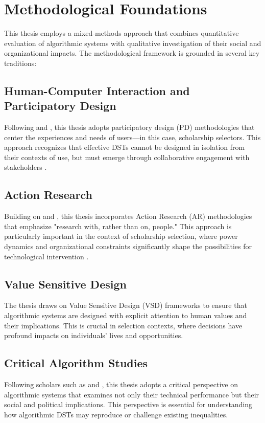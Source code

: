 \section{Methodological Foundations}\label{sec:methods_background}

This thesis employs a mixed-methods approach that combines quantitative evaluation of algorithmic systems with qualitative investigation of their social and organizational impacts. The methodological framework is grounded in several key traditions:

\subsection{Human-Computer Interaction and Participatory Design}
Following \textcite{blythe2014research} and \textcite{Knapp_Zeratzky_Kowitz_2016}, this thesis adopts participatory design (PD) methodologies that center the experiences and needs of users—in this case, scholarship selectors. This approach recognizes that effective DSTs cannot be designed in isolation from their contexts of use, but must emerge through collaborative engagement with stakeholders \cite{braun_using_2006}.

\subsection{Action Research}
Building on \textcite{Hayes_2011} and \textcite{bradbury_action_2003}, this thesis incorporates Action Research (AR) methodologies that emphasize "research with, rather than on, people." This approach is particularly important in the context of scholarship selection, where power dynamics and organizational constraints significantly shape the possibilities for technological intervention \cite{lu_organizing_2023}.

\subsection{Value Sensitive Design}
The thesis draws on Value Sensitive Design (VSD) frameworks \cite{VanKleek_Seymour_Binns_Shadbolt_2018} to ensure that algorithmic systems are designed with explicit attention to human values and their implications. This is crucial in selection contexts, where decisions have profound impacts on individuals' lives and opportunities.

\subsection{Critical Algorithm Studies}
Following scholars such as \textcite{noble2018algorithms} and \textcite{oneill2016weapons}, this thesis adopts a critical perspective on algorithmic systems that examines not only their technical performance but their social and political implications. This perspective is essential for understanding how algorithmic DSTs may reproduce or challenge existing inequalities.

